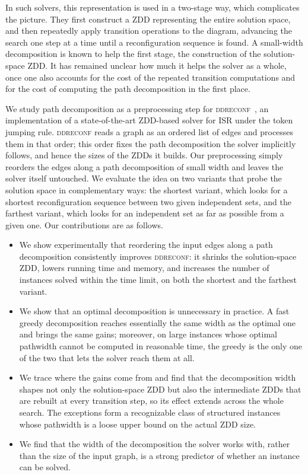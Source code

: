 \documentclass[conference]{IEEEtran}
\newcommand{\ISR}{\textsc{ISR}\xspace}
\begin{document}
In such solvers, this representation is used in a two-stage way, which complicates
the picture. They first construct a ZDD representing the entire solution space,
and then repeatedly apply transition operations to the diagram, advancing the search one
step at a time until a reconfiguration sequence is found. A small-width
decomposition is known to help the first stage, the construction of the
solution-space ZDD. It has remained unclear how much it helps the solver as a
whole, once one also accounts for the cost of the repeated transition computations
and for the cost of computing the path decomposition in the first place.



We study path decomposition as a preprocessing step for
\textsc{ddreconf}~\cite{ItoKNSSTT23}, an implementation of a state-of-the-art ZDD-based
solver for \ISR
under the token jumping rule. \textsc{ddreconf} reads a graph as an ordered list
of edges and processes them in that order; this order fixes the path
decomposition the solver implicitly follows, and hence the sizes of the ZDDs it
builds. Our preprocessing simply reorders the edges along a path decomposition of
small width and leaves the solver itself untouched. We evaluate the idea on two
variants that probe the solution space in complementary ways: the shortest
variant, which looks for a shortest reconfiguration sequence between two given
independent sets, and the farthest variant, which looks for an independent set as
far as possible from a given one. Our contributions are as follows.
\begin{itemize}
\item We show experimentally that reordering the input edges along a path
decomposition consistently improves \textsc{ddreconf}: it shrinks the
solution-space ZDD, lowers running time and memory, and increases the number of
instances solved within the time limit, on both the shortest and the farthest
variant.
\item We show that an optimal decomposition is unnecessary in practice. A fast
greedy decomposition reaches essentially the same width as the optimal one and
brings the same gains; moreover, on large instances whose optimal pathwidth cannot
be computed in reasonable time, the greedy is the only one of the two that lets
the solver reach them at all.
\item We trace where the gains come from and find that the decomposition width
shapes not only the solution-space ZDD but also the intermediate ZDDs that are
rebuilt at every transition step, so its effect extends across the whole search.
The exceptions form a recognizable class of structured instances whose pathwidth
is a loose upper bound on the actual ZDD size.
\item We find that the width of the decomposition the solver works with, rather
than the size of the input graph, is a strong predictor of whether an instance can
be solved.
\end{itemize}
\end{document}
